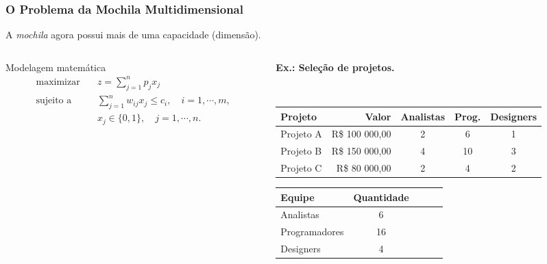 \documentclass[10pt,fleqn]{beamer}
\newcommand{\chamada}[1]{
  \textcolor{ninfagreen}{\textbf{#1}}
  \vspace{10pt}
}
\begin{document}
\begin{frame}
  \frametitle{O Problema da Mochila Multidimensional}
  A \textit{mochila} agora possui mais de uma capacidade (dimensão).
  \begin{columns}[T]
	  \begin{column}{.5\textwidth}
      \begin{block}{Modelagem matemática}
	    { \footnotesize
        \begin{align*}
          \textrm{maximizar}
            \quad & z = \sum_{j=1}^n p_j x_j \\
          \textrm{sujeito a}
  	        \quad & \sum_{j=1}^n w_{ij}x_j \leq c_i, \quad i=1,\cdots,m, \\
                & x_j \in \{0,1\}, \quad j=1,\cdots,n.
        \end{align*}
		}
      \end{block}
    \end{column}
      \begin{column}{.5\textwidth}
	  { \tiny
	  \begin{center}
	  \chamada{\small Ex.: Seleção de projetos.}
	  \\
      \begin{tabular}{|l|r|c|c|c|} \hline
      {\bf Projeto} & {\bf Valor} & {\bf Analistas} & {\bf Prog.} & {\bf Designers} \\ \hline
	  Projeto A & R\$ 100 000,00 & 2 & 6 & 1 \\ \hline
	  Projeto B & R\$ 150 000,00 & 4 & 10 & 3 \\ \hline
	  Projeto C & R\$ 80 000,00 & 2 & 4 & 2 \\ \hline
      \end{tabular}
	  \end{center}

	  \begin{center}
      \begin{tabular}{|l|c|c|c|c|} \hline
        {\bf Equipe} & {\bf Quantidade} \\ \hline
	    Analistas & 6 \\ \hline
	    Programadores & 16 \\ \hline
	    Designers & 4 \\ \hline
      \end{tabular}
	  \end{center}
	  }
    \end{column}
  \end{columns}
\end{frame}
\end{document}
